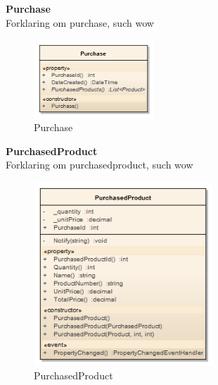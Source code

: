 \textbf{Purchase}\\
Forklaring om purchase, such wow


\begin{figure}[H]
    \centering
    \includegraphics[width=0.4\textwidth]{Systemdesign/SharedLib/Images/Klasser/Model/Purchase.png}
    \caption{Purchase}
    \label{fig:klasseModelPurch}
\end{figure}


\textbf{PurchasedProduct}\\
Forklaring om purchasedproduct, such wow


\begin{figure}[H]
    \centering
    \includegraphics[width=0.6\textwidth]{Systemdesign/SharedLib/Images/Klasser/Model/PurchasedProduct.png}
    \caption{PurchasedProduct}
    \label{fig:klasseModelPurPrd}
\end{figure}
